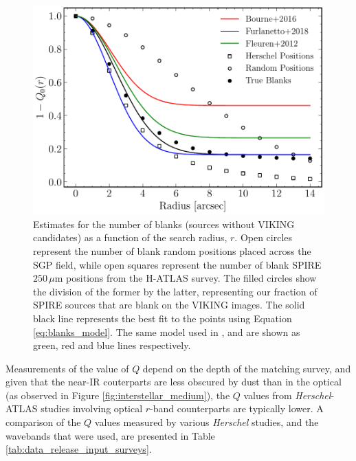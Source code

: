 \begin{figure}
    \centering
	\includegraphics[width=0.75\columnwidth]{Figures/Q_estimate.pdf}
	\caption[An estimate for the number of blank sources as a function of search radius]{Estimates for the number of blanks (sources without VIKING candidates) as a function of the search radius, $r$. Open circles represent the number of blank random positions placed across the SGP field, while open squares represent the number of blank SPIRE $250\,\mu$m positions from the H-ATLAS survey. The filled circles show the division of the former by the latter, representing our fraction of SPIRE sources that are blank on the VIKING images. The solid black line represents the best fit to the points using Equation \ref{eq:blanks_model}. The same model used in \citealt{Fleuren_2012}, \citealt{Bourne_2016} and \citealt{Furlanetto_2018} are shown as green, red and blue lines respectively.}
	\label{fig:Q_estimate}
\end{figure}

Measurements of the value of $Q$ depend on the depth of the matching survey, and given that the near-IR couterparts are less obscured by dust than in the optical (as observed in Figure \ref{fig:interstellar_medium}), the $Q$ values from \textit{Herschel}-ATLAS studies involving optical $r$-band counterparts are typically lower. A comparison of the $Q$ values measured by various \textit{Herschel} studies, and the wavebands that were used, are presented in Table \ref{tab:data_release_input_surveys}.

